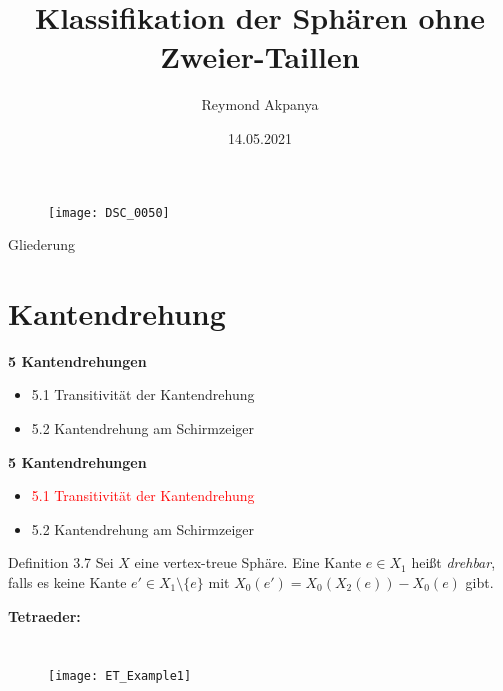 \documentclass{beamer}
\author{Reymond Akpanya}
\title{Klassifikation der Sphären ohne Zweier-Taillen}
\date{14.05.2021 }
\begin{document}
\frame{\maketitle}
\frame{\tableofcontents[currentsection]}
\begin{frame}
\begin{figure}[H]
\begin{center}
\texttt{[image: DSC\_0050]}
\end{center}
\end{figure}
\end{frame}
\begin{frame}{Gliederung}
\tableofcontents
\end{frame}
\section{Kantendrehung}
\begin{frame}
\textbf{5 Kantendrehungen}
\begin{itemize}
\item 5.1 Transitivität der Kantendrehung
\item 5.2 Kantendrehung am Schirmzeiger
\end{itemize}
\end{frame}
\begin{frame}
\textbf{5 Kantendrehungen}
\begin{itemize}
\item \textcolor{red}{5.1 Transitivität der Kantendrehung}
\item 5.2 Kantendrehung am Schirmzeiger
\end{itemize}
\end{frame}
\begin{frame}
\begin{block}{Definition 3.7}
Sei $X$ eine vertex-treue Sphäre. Eine Kante $e\in X_1$ heißt  \emph{drehbar}, falls es keine Kante $e'\in X_1\setminus \{e\}$ mit $X_0(e')=X_0(X_2(e))-X_0(e)$ gibt.
\end{block}
\end{frame}
\begin{frame}
\textbf{Tetraeder:}
\begin{columns}

\begin{figure}[H]
\begin{center}
\texttt{[image: ET\_Example1]}
\end{center}
\end{figure}


\end{columns}
\end{frame}
\end{document}
